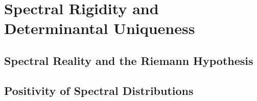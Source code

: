 \section{Spectral Rigidity and Determinantal Uniqueness}
\label{sec:spectral_rigidity}



\subsection{Spectral Reality and the Riemann Hypothesis}






















\subsection{Positivity of Spectral Distributions}

